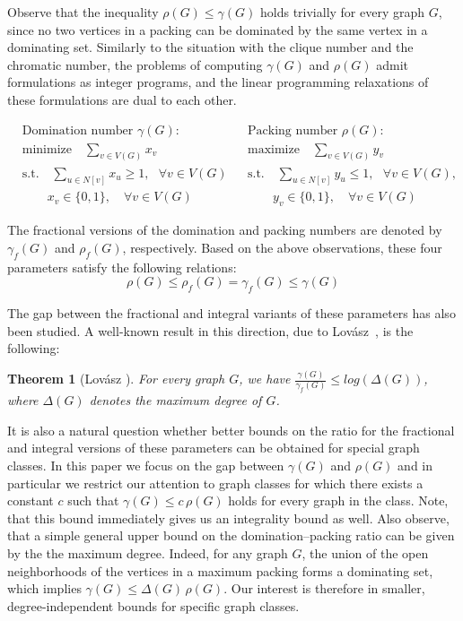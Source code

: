\documentclass[a4paper, 12pt]{article}
\newtheorem*{thmnonum}{Theorem}
\begin{document}
Observe that the inequality $\rho(G) \leq \gamma(G)$ holds trivially for every graph $G$, since no two vertices in a packing can be dominated by the same vertex in a dominating set. 
Similarly to the situation with the clique number and the chromatic number, the problems of computing $\gamma(G)$ and $\rho(G)$ admit formulations as integer programs, and the linear programming relaxations of these formulations are dual to each other.


\begin{align}\label{eq:LP-relax}
&\text{Domination number } \gamma(G): && \text{Packing number } \rho(G): \nonumber\\
&\text{minimize} \quad \sum_{v\in V(G)} x_v&
&\text{maximize} \quad \sum_{v\in V(G)} y_v \nonumber\\
&\text{s.t.} \quad \sum_{u\in N[v]} x_u \ge 1, \mbox{     }\forall v\in V(G)&
&\text{s.t.} \quad  \sum_{u\in N[v]} y_u\le 1, \mbox{     }\forall v\in V(G), \nonumber\\
&\quad \quad x_v\in \{0,1\}, \quad \forall v\in V(G)&
&\quad \quad y_v\in \{0,1\}, \quad \forall v\in V(G) \nonumber
\end{align}

The fractional versions of the domination and packing numbers are denoted by $\gamma_f(G)$ and $\rho_f(G)$, respectively. Based on the above observations, these four parameters satisfy the following relations:
$$\rho(G)\leq\rho_f(G) = \gamma_f(G)\leq\gamma(G)$$

The gap between the fractional and integral variants of these parameters has also been studied. A well-known result in this direction, due to Lovász~\cite{Lovasz75}, is the following:

\begin{thmnonum}[Lovász \cite{Lovasz75}]
    For every graph $G$, we have $\frac{\gamma(G)}{\gamma_f(G)} \leq log(\Delta(G))$, where $\Delta(G)$ denotes the  maximum degree of $G$.
\end{thmnonum}

It is also a natural question whether better bounds on the ratio for the fractional and integral versions of these parameters can be obtained for special graph classes. In this paper we focus on the gap between $\gamma(G)$ and $\rho(G)$ and in particular we restrict our attention to graph classes for which there exists a constant $c$ such that $\gamma(G) \leq c\,\rho(G)$ holds for every graph in the class. Note, that this bound immediately gives us an integrality bound as well.
Also observe, that a simple general upper bound on the domination--packing ratio can be given by the the maximum degree. Indeed, for any graph $G$, the union of the open neighborhoods of the vertices in a maximum packing forms a dominating set, which implies $\gamma(G)\le \Delta(G)\,\rho(G)$. Our interest is therefore in smaller, degree-independent bounds for specific graph classes.
\end{document}
